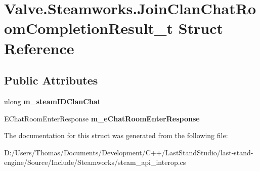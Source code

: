 \hypertarget{structValve_1_1Steamworks_1_1JoinClanChatRoomCompletionResult__t}{}\section{Valve.\+Steamworks.\+Join\+Clan\+Chat\+Room\+Completion\+Result\+\_\+t Struct Reference}
\label{structValve_1_1Steamworks_1_1JoinClanChatRoomCompletionResult__t}
\subsection*{Public Attributes}
\begin{DoxyCompactItemize}
\item 
\hypertarget{structValve_1_1Steamworks_1_1JoinClanChatRoomCompletionResult__t_afbbdb7b2ace8c98a444b77487c71b0c1}{}ulong {\bfseries m\+\_\+steam\+I\+D\+Clan\+Chat}\label{structValve_1_1Steamworks_1_1JoinClanChatRoomCompletionResult__t_afbbdb7b2ace8c98a444b77487c71b0c1}

\item 
\hypertarget{structValve_1_1Steamworks_1_1JoinClanChatRoomCompletionResult__t_a2a13020ba1c97c01933820d9e28a3b8e}{}E\+Chat\+Room\+Enter\+Response {\bfseries m\+\_\+e\+Chat\+Room\+Enter\+Response}\label{structValve_1_1Steamworks_1_1JoinClanChatRoomCompletionResult__t_a2a13020ba1c97c01933820d9e28a3b8e}

\end{DoxyCompactItemize}


The documentation for this struct was generated from the following file\+:\begin{DoxyCompactItemize}
\item 
D\+:/\+Users/\+Thomas/\+Documents/\+Development/\+C++/\+Last\+Stand\+Studio/last-\/stand-\/engine/\+Source/\+Include/\+Steamworks/steam\+\_\+api\+\_\+interop.\+cs\end{DoxyCompactItemize}
